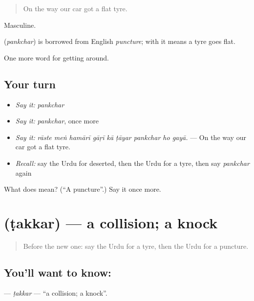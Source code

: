\begin{quote}
On the way our car got a flat tyre.
\end{quote}

Masculine.

\begin{cousinweb}
\textbf{} (\emph{pankchar}) is borrowed from English \emph{puncture}; with \textbf{} it means a tyre goes flat.
\end{cousinweb}

\begin{grammarlens}[title={What you've built}]
One more word for getting around.
\end{grammarlens}

\subsection*{Your turn}
\begin{itemize}
\raggedright
  \item \emph{Say it:} \emph{pankchar}
  \item \emph{Say it:} \emph{pankchar}, once more
  \item \emph{Say it:} \emph{rāste meṅ hamārī gāṛī kā ṭāyar pankchar ho gayā.} — On the way our car got a flat tyre.
  \item \emph{Recall:} say the Urdu for deserted, then the Urdu for a tyre, then say \emph{pankchar} again
\end{itemize}

\begin{tcolorbox}[breakable,colback=teal!4,colframe=teal!35!black,title={Before you move on}]
What does  mean? (\textquotedblleft{}A puncture\textquotedblright{}.) Say it once more.
\end{tcolorbox}
\section[\texorpdfstring{\ur{ٹکر} (ṭakkar)}{ٹکر (ṭakkar)}]{ (ṭakkar) — a collision; a knock}

\label{lesson:UR-C395-takkar}



\begin{quote}
Before the new one: say the Urdu for a tyre, then the Urdu for a puncture.
\end{quote}

\subsection*{You'll want to know: }
\textbf{} — \emph{ṭakkar} — \textquotedblleft{}a collision; a knock\textquotedblright{}.

